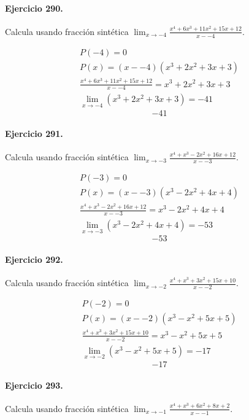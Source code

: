 \documentclass[11pt,a4paper]{article}
\begin{document}
\paragraph{Ejercicio 290.} Calcula usando fracción sintética $\displaystyle\lim_{x\to -4}\frac{x^4 + 6x^3 + 11x^2 + 15x + 12}{x--4}$. 

\[
\begin{aligned}
P(-4)=0\\
P(x)=(x--4)(x^3 + 2x^2 + 3x + 3)\\
\frac{x^4 + 6x^3 + 11x^2 + 15x + 12}{x--4}=x^3 + 2x^2 + 3x + 3\\
\lim_{x\to -4}(x^3 + 2x^2 + 3x + 3)=-41
\end{aligned}
\]
\[\boxed{-41}\]


\paragraph{Ejercicio 291.} Calcula usando fracción sintética $\displaystyle\lim_{x\to -3}\frac{x^4 + x^3 - 2x^2 + 16x + 12}{x--3}$. 

\[
\begin{aligned}
P(-3)=0\\
P(x)=(x--3)(x^3 - 2x^2 + 4x + 4)\\
\frac{x^4 + x^3 - 2x^2 + 16x + 12}{x--3}=x^3 - 2x^2 + 4x + 4\\
\lim_{x\to -3}(x^3 - 2x^2 + 4x + 4)=-53
\end{aligned}
\]
\[\boxed{-53}\]


\paragraph{Ejercicio 292.} Calcula usando fracción sintética $\displaystyle\lim_{x\to -2}\frac{x^4 + x^3 + 3x^2 + 15x + 10}{x--2}$. 

\[
\begin{aligned}
P(-2)=0\\
P(x)=(x--2)(x^3 - x^2 + 5x + 5)\\
\frac{x^4 + x^3 + 3x^2 + 15x + 10}{x--2}=x^3 - x^2 + 5x + 5\\
\lim_{x\to -2}(x^3 - x^2 + 5x + 5)=-17
\end{aligned}
\]
\[\boxed{-17}\]


\paragraph{Ejercicio 293.} Calcula usando fracción sintética $\displaystyle\lim_{x\to -1}\frac{x^4 + x^3 + 6x^2 + 8x + 2}{x--1}$. 
\end{document}
